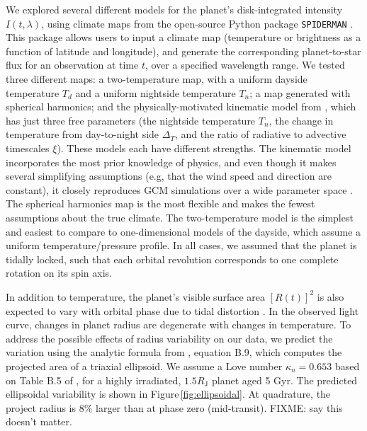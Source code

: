 \documentclass[twocolumn]{aastex61}
\begin{document}
We explored several different models for the planet's disk-integrated intensity $I(t, \lambda)$, using climate maps from the open-source Python package \texttt{SPIDERMAN} \citep{louden17}. This package allows users to input a climate map (temperature or brightness as a function of latitude and longitude), and generate the corresponding planet-to-star flux for an observation at time $t$, over a specified wavelength range. We tested three different maps: a two-temperature map, with a uniform dayside temperature $T_d$ and a uniform nightside temperature $T_n$; a map generated with spherical harmonics; and the physically-motivated kinematic model from \cite{zhang16}, which has just three free parameters (the nightside temperature $T_n$, the change in temperature from day-to-night side $\Delta_T$, and the ratio of radiative to advective timescales $\xi$). These models each have different strengths. The kinematic model incorporates the most prior knowledge of physics, and even though it makes several simplifying assumptions (e.g, that the wind speed and direction are constant), it closely reproduces GCM simulations over a wide parameter space \citep{zhang16}.   The spherical harmonics map is the most flexible and makes the fewest assumptions about the true climate. The two-temperature model is the simplest and easiest to compare to one-dimensional models of the dayside, which assume a uniform temperature/pressure profile.  In all cases, we assumed that the planet is tidally locked, such that each orbital revolution corresponds to one complete rotation on its spin axis. %

In addition to temperature, the planet's visible surface area $[R(t)]^2$ is also expected to vary with orbital phase due to tidal distortion \citep{gillon14}. In the observed light curve, changes in planet radius are degenerate with changes in temperature. To address the possible effects of radius variability on our data, we predict the variation using the analytic formula from \cite{leconte11b}, equation B.9, which computes the projected area of a triaxial ellipsoid. We assume a Love number $\kappa_n = 0.653$ based on Table B.5 of \cite{leconte11a}, for a highly irradiated, $1.5 R_\mathrm{J}$ planet aged 5 Gyr. The predicted ellipsoidal variability is shown in Figure\,\ref{fig:ellipsoidal}. At quadrature, the project radius is $8\%$ larger than at phase zero (mid-transit). FIXME: say this doesn't matter.
\end{document}
